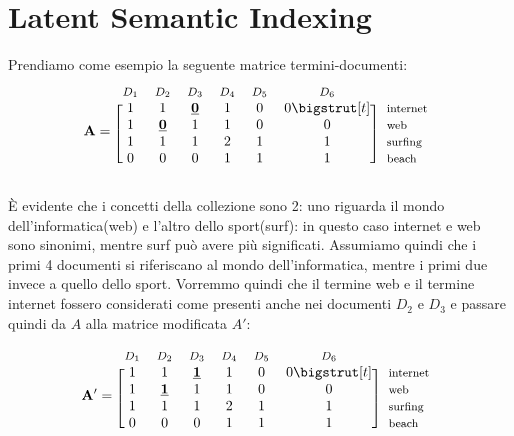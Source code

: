 \chapter{Latent Semantic Indexing}
\label{cap:latent-semantic-indexing}
Prendiamo come esempio la seguente matrice termini-documenti:
\begin{equation*}
    \mathbf{A}=
    \begin{blockarray}{*{6}{c} l}
      \begin{block}{*{6}{>{$\footnotesize}c<{$}} l}
        $D_1$ & $D_2$ & $D_3$ & $D_4$ & $D_5$ & $D_6$ & \\
      \end{block}
      \begin{block}{[*{6}{c}]>{$\footnotesize}l<{$}}
        1 & 1 & \textbf{\underline{0}} & 1 & 0 & 0 \bigstrut[t]& internet \\
        1 & \textbf{\underline{0}} & 1 & 1 & 0 & 0 & web \\
        1 & 1 & 1 & 2 & 1 & 1 & surfing \\
        0 & 0 & 0 & 1 & 1 & 1 & beach \\
      \end{block}
    \end{blockarray}
  \end{equation*}

È evidente che i concetti della collezione sono 2: uno riguarda il mondo dell'informatica(web) e l'altro dello sport(surf): in questo caso internet e web sono sinonimi, mentre surf può avere più significati. Assumiamo quindi che i primi 4 documenti si riferiscano al mondo dell'informatica, mentre i primi due invece a quello dello sport. Vorremmo quindi che il termine web e il termine internet fossero considerati come presenti anche nei documenti $D_2$ e $D_3$ e passare quindi da $A$ alla matrice modificata $A'$:

  \begin{equation*}
    \mathbf{A'}=
    \begin{blockarray}{*{6}{c} l}
      \begin{block}{*{6}{>{$\footnotesize}c<{$}} l}
        $D_1$ & $D_2$ & $D_3$ & $D_4$ & $D_5$ & $D_6$ & \\
      \end{block}
      \begin{block}{[*{6}{c}]>{$\footnotesize}l<{$}}
        1 & 1 & \textbf{\underline{1}} & 1 & 0 & 0 \bigstrut[t]& internet \\
        1 & \textbf{\underline{1}} & 1 & 1 & 0 & 0 & web \\
        1 & 1 & 1 & 2 & 1 & 1 & surfing \\
        0 & 0 & 0 & 1 & 1 & 1 & beach \\
      \end{block}
    \end{blockarray}
  \end{equation*}

